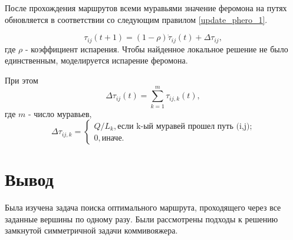 После прохождения маршрутов всеми муравьями значение феромона на путях обновляется в соответствии со следующим правилом \eqref{update_phero_1}.

\begin{equation}
	\label{update_phero_1}
		\tau_{ij}(t+1) = (1-\rho)\dot \tau_{ij}(t) + \Delta \tau_{ij},
\end{equation}
где $\rho$ - коэффициент испарения. Чтобы найденное локальное решение не было единственным, моделируется испарение феромона.

При этом
\begin{equation}
\label{update_phero_2}
 \Delta \tau_{ij}(t) = \sum_{k=1}^m \tau_{ij, k}(t),
\end{equation}
где $m$ - число муравьев,
\begin{equation}
	\label{update_phero_3}
		 \Delta\tau_{ij,k} = \begin{cases}
		Q/L_{k}, \textrm{если k-ый муравей прошел путь (i,j);} \\
		0,\textrm{иначе.}
	\end{cases}
\end{equation}

\section*{Вывод}

Была изучена задача поиска оптимального маршрута, проходящего через все заданные вершины по одному разу. Были рассмотрены подходы к решению замкнутой симметричной задачи коммивояжера.